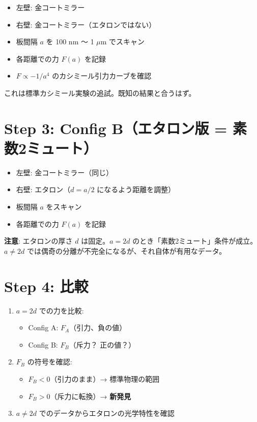 \documentclass[12pt,a4paper]{article}
\begin{document}
\begin{expbox}[基準データの取得]
\begin{itemize}
\item 左壁: 金コートミラー
\item 右壁: 金コートミラー（エタロンではない）
\item 板間隔 $a$ を 100 nm 〜 1 $\mu$m でスキャン
\item 各距離での力 $F(a)$ を記録
\item $F \propto -1/a^4$ のカシミール引力カーブを確認
\end{itemize}
これは標準カシミール実験の追試。既知の結果と合うはず。
\end{expbox}

\section{Step 3: Config B（エタロン版 = 素数2ミュート）}

\begin{expbox}[本実験]
\begin{itemize}
\item 左壁: 金コートミラー（同じ）
\item 右壁: エタロン（$d = a/2$ になるよう距離を調整）
\item 板間隔 $a$ をスキャン
\item 各距離での力 $F(a)$ を記録
\end{itemize}

\textbf{注意}: エタロンの厚さ $d$ は固定。$a = 2d$ のとき「素数2ミュート」条件が成立。$a \neq 2d$ では偶奇の分離が不完全になるが、それ自体が有用なデータ。
\end{expbox}

\section{Step 4: 比較}

\begin{expbox}[データ解析]
\begin{enumerate}
\item $a = 2d$ での力を比較:
    \begin{itemize}
    \item Config A: $F_A$（引力、負の値）
    \item Config B: $F_B$（斥力？ 正の値？）
    \end{itemize}
\item $F_B$ の符号を確認:
    \begin{itemize}
    \item $F_B < 0$（引力のまま）→ 標準物理の範囲
    \item $F_B > 0$（斥力に転換）→ \textbf{新発見}
    \end{itemize}
\item $a \neq 2d$ でのデータからエタロンの光学特性を確認
\end{enumerate}
\end{expbox}
\end{document}
